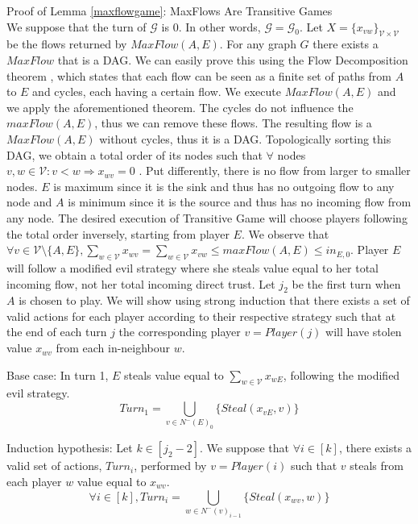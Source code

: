\begin{sepproof}{Proof of Lemma \ref{maxflowgame}: MaxFlows Are Transitive Games} \ \\
\label{maxflowgameproof}
  We suppose that the turn of $\mathcal{G}$ is 0. In other words, $\mathcal{G} = \mathcal{G}_0$. Let
  $X = \{x_{vw}\}_{\mathcal{V} \times \mathcal{V}}$ be the flows returned by $MaxFlow\left(A, E\right)$. For any graph
  $G$ there exists a $MaxFlow$ that is a DAG. We can easily prove this using the Flow Decomposition theorem
  \cite{amo}, which states that each flow can be seen as a finite set of paths from $A$ to $E$ and cycles, each
  having a certain flow. We execute $MaxFlow\left(A, E\right)$ and we apply the aforementioned theorem. The
  cycles do not influence the $maxFlow\left(A, E\right)$, thus we can remove these flows. The resulting flow is a
  $MaxFlow\left(A, E\right)$ without cycles, thus it is a DAG. Topologically sorting this DAG, we obtain a total order
  of its nodes such that $\forall$ nodes $v, w \in \mathcal{V} : v < w \Rightarrow x_{wv} = 0$ \cite{clrs}. Put
  differently, there is no flow from larger to smaller nodes. $E$ is maximum since it is the sink and thus has no
  outgoing flow to any node and $A$ is minimum since it is the source and thus has no incoming flow from any node. The
  desired execution of Transitive Game will choose players following the total order inversely, starting from player
  $E$. We observe that $\forall v \in \mathcal{V} \setminus \{A, E\}, \sum\limits_{w \in \mathcal{V}}x_{wv} =
  \sum\limits_{w \in \mathcal{V}}x_{vw} \leq maxFlow\left(A, E\right) \leq in_{E, 0}$. Player $E$ will follow a modified
  evil strategy where she steals value equal to her total incoming flow, not her total incoming direct trust. Let $j_2$ be
  the first turn when $A$ is chosen to play. We will show using strong induction that there exists a set of valid actions
  for each player according to their respective strategy such that at the end of each turn $j$ the corresponding player
  $v = Player\left(j\right)$ will have stolen value $x_{wv}$ from each in-neighbour $w$.

  Base case: In turn 1, $E$ steals value equal to $\sum\limits_{w \in \mathcal{V}}x_{wE}$, following the modified evil
  strategy.
  \begin{equation*}
    Turn_1 = \bigcup\limits_{v \in N^{-}\left(E\right)_0}\{Steal\left(x_{vE}, v\right)\}
  \end{equation*}

  Induction hypothesis: Let $k \in [j_2 - 2]$. We suppose that $\forall i \in [k]$, there exists a valid set of actions,
  $Turn_i$, performed by $v = Player\left(i\right)$ such that $v$ steals from each player $w$ value equal to $x_{wv}$.
  \begin{equation*}
    \forall i \in [k], Turn_i = \bigcup\limits_{w \in N^{-}\left(v\right)_{i-1}}\{Steal\left(x_{wv}, w\right)\}
  \end{equation*}


\end{sepproof}
